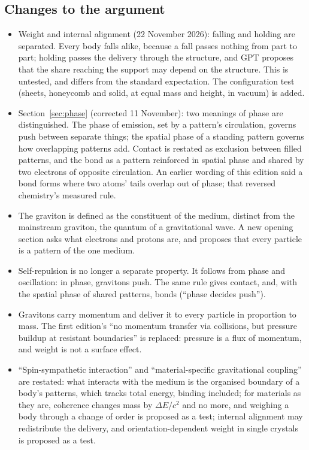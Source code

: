 \documentclass[11pt,a4paper]{article}
\begin{document}
\subsection*{Changes to the argument}
\begin{itemize}
  \item Weight and internal alignment (22 November 2026): falling and holding are separated. Every body falls alike, because a fall passes nothing from part to part; holding passes the delivery through the structure, and GPT proposes that the share reaching the support may depend on the structure. This is untested, and differs from the standard expectation. The configuration test (sheets, honeycomb and solid, at equal mass and height, in vacuum) is added.
\item Section~\ref{sec:phase} (corrected 11 November): two meanings of phase are distinguished. The phase of emission, set by a pattern's circulation, governs push between separate things; the spatial phase of a standing pattern governs how overlapping patterns add. Contact is restated as exclusion between filled patterns, and the bond as a pattern reinforced in spatial phase and shared by two electrons of opposite circulation. An earlier wording of this edition said a bond forms where two atoms' tails overlap out of phase; that reversed chemistry's measured rule.
\item The graviton is defined as the constituent of the medium, distinct from the mainstream graviton, the quantum of a gravitational wave. A new opening section asks what electrons and protons are, and proposes that every particle is a pattern of the one medium.
\item Self-repulsion is no longer a separate property. It follows from phase and oscillation: in phase, gravitons push. The same rule gives contact, and, with the spatial phase of shared patterns, bonds (``phase decides push'').
\item Gravitons carry momentum and deliver it to every particle in proportion to mass. The first edition's ``no momentum transfer via collisions, but pressure buildup at resistant boundaries'' is replaced: pressure is a flux of momentum, and weight is not a surface effect.
\item ``Spin-sympathetic interaction'' and ``material-specific gravitational coupling'' are restated: what interacts with the medium is the organised boundary of a body's patterns, which tracks total energy, binding included; for materials as they are, coherence changes mass by $\Delta E/c^2$ and no more, and weighing a body through a change of order is proposed as a test; internal alignment may redistribute the delivery, and orientation-dependent weight in single crystals is proposed as a test.

\end{itemize}
\end{document}
